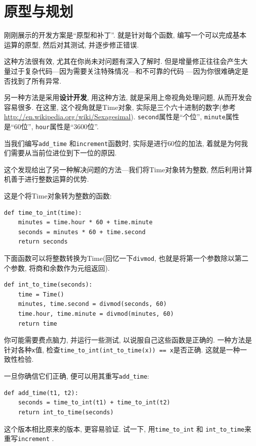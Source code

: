 \documentclass[10pt]{book}
\begin{document}
\section{原型与规划}
\label{prototype}

刚刚展示的开发方案是``原型和补丁''.
就是针对每个函数, 编写一个可以完成基本运算的原型, 然后对其测试, 
并逐步修正错误. 

这种方法很有效, 尤其在你尚未对问题有深入了解时. 
但是增量修正往往会产生大量过于复杂代码---因为需要关注特殊情况---和不可靠的代码
---因为你很难确定是否找到了所有异常. 

另一种方法是采用{\bf 设计开发}, 用这种方法, 就是采用上帝视角处理问题, 
从而开发会容易很多. 
在这里, 这个视角就是Time对象, 实际是三个六十进制的数字(参考\url{http://en.wikipedia.org/wiki/Sexagesimal}). 
{\tt second}属性是``个位'', {\tt minute}属性是``60位'', {\tt hour}属性是``3600位''.

当我们编写\verb"add_time" 和{\tt increment}函数时, 
实际是进行60位的加法, 着就是为何我们需要从当前位进位到下一位的原因. 

这个发现给出了另一种解决问题的方法---我们将Time对象转为整数, 
然后利用计算机善于进行整数运算的优势. 

这是个将Time对象转为整数的函数:

\begin{verbatim}
def time_to_int(time):
    minutes = time.hour * 60 + time.minute
    seconds = minutes * 60 + time.second
    return seconds
\end{verbatim}
%
下面函数可以将整数转换为Time(回忆一下{\tt divmod}, 也就是将第一个参数除以第二个参数, 
将商和余数作为元组返回). 

\begin{verbatim}
def int_to_time(seconds):
    time = Time()
    minutes, time.second = divmod(seconds, 60)
    time.hour, time.minute = divmod(minutes, 60)
    return time
\end{verbatim}
%
你可能需要费点脑力, 并运行一些测试, 以说服自己这些函数是正确的. 
一种方法是针对各种{\tt x}值, 检查\verb"time_to_int(int_to_time(x)) == x"是否正确. 
这就是一种一致性检验. 

一旦你确信它们正确, 便可以用其重写\verb"add_time":

\begin{verbatim}
def add_time(t1, t2):
    seconds = time_to_int(t1) + time_to_int(t2)
    return int_to_time(seconds)
\end{verbatim}
%
这个版本相比原来的版本, 更容易验证. 
试一下, 用\verb"time_to_int" 和
\verb"int_to_time"来重写{\tt increment} . 
\end{document}
